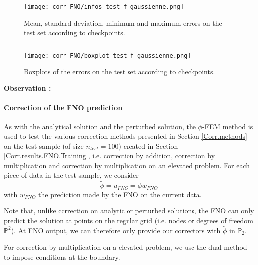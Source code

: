 \begin{minipage}{0.48\linewidth}
	\begin{figure}[H]
		\centering
		\texttt{[image: corr\_FNO/infos\_test\_f\_gaussienne.png]}
		\caption{Mean, standard deviation, minimum and maximum errors on the test set according to checkpoints.}
		\label{infos_test_f_gaussienne}
	\end{figure} 
\end{minipage} $\qquad$
\begin{minipage}{0.48\linewidth}
	\begin{figure}[H]
		\centering
		\texttt{[image: corr\_FNO/boxplot\_test\_f\_gaussienne.png]}
		\caption{Boxplots of the errors on the test set according to checkpoints.}
		\label{boxplot_test_f_gaussienne}
	\end{figure} 
\end{minipage}

\textbf{Observation :} 

\paragraph{Correction of the FNO prediction} \label{Corr.results.FNO.Corr}

As with the analytical solution and the perturbed solution, the $\phi$-FEM method is used to test the various correction methods presented in Section \ref{Corr.methods} on the test sample (of size $n_{test}=100$) created in Section \ref{Corr.results.FNO.Training}, i.e. correction by addition, correction by multiplication and correction by multiplication on an elevated problem. For each piece of data in the test sample, we consider  
\begin{equation*}
	\tilde{\phi}=u_{FNO}=\phi w_{FNO}
\end{equation*}
with $w_{FNO}$ the prediction made by the FNO on the current data.

\begin{Rem}
	Note that, unlike correction on analytic or perturbed solutions, the FNO can only predict the solution at points on the regular grid (i.e. nodes or degrees of freedom $\mathbb{P}^2$). At FNO output, we can therefore only provide our correctors with $\tilde{\phi}$ in $\mathbb{P}_2$.
\end{Rem}

For correction by multiplication on a elevated problem, we use the dual method to impose conditions at the boundary.

